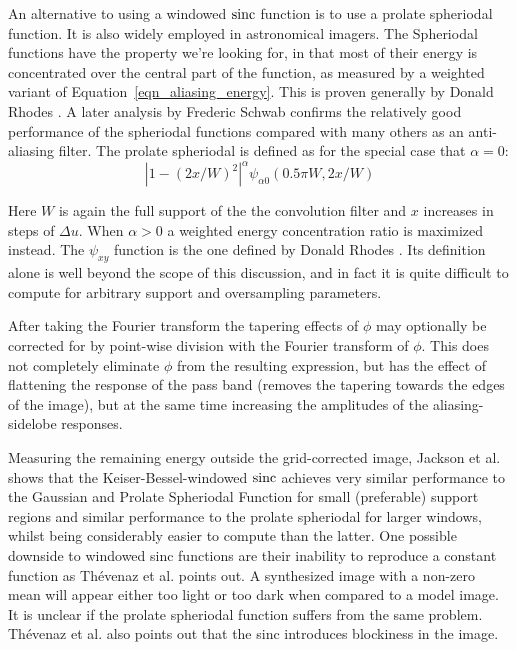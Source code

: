  An alternative to using a windowed $\operatorname*{sinc}$ function is to use a prolate spheriodal function. It is also widely employed in 
 astronomical imagers. The Spheriodal functions have the property we're looking for, in that most of their energy is concentrated 
 over the central part of the function, as measured by a weighted variant of Equation~\ref{eqn_aliasing_energy}. This is proven generally by 
 Donald Rhodes \cite{rhodes1970spheroidal}. A later analysis by Frederic Schwab \cite{schwab1984optimal} confirms the relatively good 
 performance of the spheriodal functions compared with many others as an anti-aliasing filter. The prolate spheriodal is defined as 
 for the special case that $\alpha=0$:
 \begin{equation}
  |1-(2x/W)^2|^\alpha\psi_{\alpha0}(0.5\pi W,2x/W)
 \end{equation}
 
 Here $W$ is again the full support of the the convolution filter and $x$ increases in steps of $\Delta{u}$. When $\alpha>0$ a 
 weighted energy concentration ratio is maximized instead. The $\psi_{xy}$ function is the one defined by Donald Rhodes \cite{rhodes1970spheroidal}.
 Its definition alone is well beyond the scope of this discussion, and in fact it is quite difficult to compute for arbitrary support and
 oversampling parameters.
 
 After taking the Fourier transform the tapering effects of $\phi$ may optionally be corrected for by point-wise division with the Fourier transform of
 $\phi$. This does not completely eliminate $\phi$ from the resulting expression, but has the effect of flattening the response of the pass band (removes the
 tapering towards the edges of the image), but at the same time increasing the amplitudes of the aliasing-sidelobe responses.
 
 Measuring the remaining energy outside the grid-corrected image, Jackson et al.\cite{jackson1991selection} shows that the Keiser-Bessel-windowed $\operatorname*{sinc}$ achieves 
 very similar performance to the Gaussian and Prolate Spheriodal Function for small (preferable) support regions and similar performance to the 
 prolate spheriodal for larger windows, whilst being considerably easier to compute than the latter. One possible downside to windowed sinc functions
 are their inability to reproduce a constant function as Th\'evenaz et al. \cite{thevenaz2000image} points out. A synthesized image with a non-zero 
 mean will appear either too light or too dark when compared to a model image. It is unclear if the prolate spheriodal function suffers from the same
 problem. Th\'evenaz et al. also points out that the sinc introduces blockiness in the image.
 

